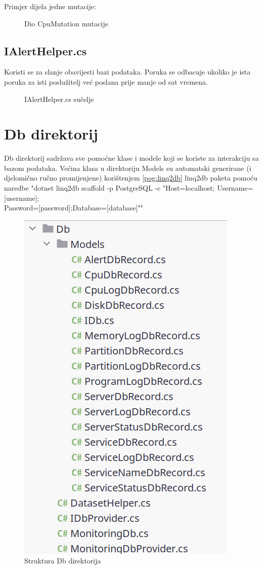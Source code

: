 \documentclass[zavrsnirad]{fer}
\begin{document}
Primjer dijela jedne mutacije:
\begin{figure}[htb]
	\centering
	
	\caption{Dio CpuMutation mutacije}
\end{figure}
\FloatBarrier

\subsection{IAlertHelper.cs}
Koristi se za slanje obavijesti bazi podataka. Poruka se odbacuje ukoliko je ista poruka za isti poslužitelj već poslana prije manje od sat vremena.

\begin{figure}[htb]
	\centering
	
	\caption{IAlertHelper.cs sučelje}
\end{figure}
\FloatBarrier

\section{Db direktorij}
\label{pog:db_dir}
Db direktorij sadržava sve pomoćne klase i modele koji se koriste za interakciju sa bazom podataka. Većina klasa u direktoriju Models su automatski generirane (i djelomično ručno promijenjene) korištenjem \ref{pog:linq2db} linq2db paketa pomoću naredbe "dotnet linq2db scaffold -p PostgreSQL -c "Host=localhost; Username=[username];\\Password=[password];Database=[database]""

\begin{figure}[htb!]
	\centering
	\includegraphics[width=0.5\linewidth]{images/db_dir_structure.png} 
	\caption{Struktura Db direktorija}
	\label{slk:db_dir_structure}
\end{figure}
\FloatBarrier
\end{document}
